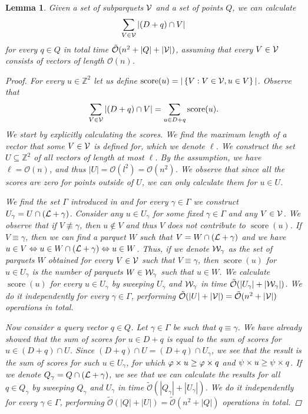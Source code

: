 \documentclass[11pt]{article}
\newcommand{\Z}{\mathbb{Z}}
\renewcommand{\O}{\mathcal{O}}
\newcommand{\tO}{\tilde{\mathcal{O}}}
\newcommand{\set}[1]{\left\lbrace #1 \right\rbrace}
\theoremstyle{plain}
\newtheorem{lemma}{Lemma}
\theoremstyle{definition}
\theoremstyle{remark}
\DeclareMathOperator*{\score}{score}
\begin{document}
\begin{lemma}\label{primitive_conv}
	Given a set of subparquets $\mathcal{V}$ and a set of points $Q$, we can calculate
	$$ \sum_{V \in \mathcal{V}} |(D + q) \cap V| $$
	for every $q \in Q$ in total time $\tO(n^2 + |Q| + |\V|)$, assuming that every $V \in \mathcal{V}$ consists of vectors of length $\O(n)$.
	\begin{proof}
		For every $u \in \Z^2$ let us define $\score(u) = |\set{V : V \in \V, u \in V}|$. Observe that
		$$ \sum_{V \in \V} |(D + q) \cap V| = \sum_{u \in D + q} \score(u). $$
		We start by explicitly calculating the scores.
		We find the maximum length of a vector that some $V \in \mathcal{V}$ is defined for, which we denote $\ell$.
		We construct the set $U \subseteq \Z^2$ of all vectors of length at most $\ell$.
		By the assumption, we have $\ell = \O(n)$, and thus $|U| = \O(l ^ 2) = \O(n ^ 2)$.
		We observe that since all the scores are zero for points outside of $U$, we can only calculate them for $u \in U$.
		
		We find the set $\Gamma$ introduced in  and for every $\gamma \in \Gamma$ we construct $U_\gamma = U \cap (\mathcal{L} + \gamma)$.
		Consider any $u \in U_\gamma$ for some fixed $\gamma \in \Gamma$ and any $V \in \mathcal{V}$.
		We observe that if $V \not \equiv \gamma$, then $u \not \in V$ and thus $V$ does not contribute to $\score(u)$.
		If $V \equiv \gamma$, then we can find a parquet $W$ such that $V = W \cap (\mathcal{L} + \gamma)$ and we have
		$u \in V \Leftrightarrow u \in W \cap (\mathcal{L} + \gamma) \Leftrightarrow u \in W$.
		Thus, if we denote $\mathcal{W}_\gamma$ as the set of parquets $W$ obtained for every $V \in \mathcal{V}$ such that $V \equiv \gamma$, then $\score(u)$ for $u \in U_\gamma$ is the number of parquets $W \in \mathcal{W}_\gamma$ such that $u \in W$.
		We calculate $\score(u)$ for every $u \in U_\gamma$ by sweeping $U_\gamma$ and $\mathcal{W}_\gamma$ in time $\tO(|U_\gamma| + |\W_\gamma|)$.
		We do it independently for every $\gamma \in \Gamma$, performing $\tO(|U| + |\V|) = \tO(n^2 + |\V|)$ operations in total.

		Now consider a query vector $q \in Q$.
		Let $\gamma \in \Gamma$ be such that $q \equiv \gamma$.
		We have already showed that the sum of scores for $u \in D + q$ is equal to the sum of scores for $u \in (D + q) \cap U$.
		Since $(D + q) \cap U = (D + q) \cap U_\gamma$, we see that the result is the sum of scores for such $u \in U_\gamma$, for which $\varphi \times u \ge \varphi \times q$ and $\psi \times u \ge \psi \times q$.
		If we denote $Q_\gamma = Q \cap (\mathcal{L} + \gamma)$, we see that we can calculate the results for all $q \in Q_\gamma$ by sweeping $Q_\gamma$ and $U_\gamma$ in time $\tO(|Q_\gamma| + |U_\gamma|)$.
		We do it independently for every $\gamma \in \Gamma$, performing $\tO(|Q| + |U|) = \tO(n^2 + |Q|)$ operations in total.
	\end{proof}
\end{lemma}
\end{document}
